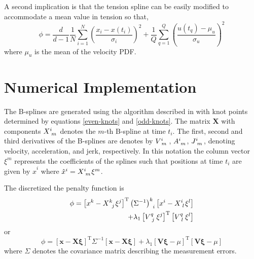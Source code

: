 \documentclass[twocol]{ametsoc}
\begin{document}
A second implication is that the tension spline can be easily modified to accommodate a mean value in tension so that,
\begin{equation}
\phi =  \frac{d}{d-1} \frac{1}{N} \sum^N _{i=1}\left( \frac{x_i - x(t_i)}{\sigma_i} \right)^2 + \frac{1}{Q} \sum^{Q}_{q=1}  \left(  \frac{u(t_q)-\mu_u}{\sigma_u} \right)^2
\end{equation}
where $\mu_u$ is the mean of the velocity PDF.

%
\section{Numerical Implementation}
%

The B-splines are generated using the algorithm described in \citet{deboor1978-book} with knot points determined by equations \ref{even-knots} and \ref{odd-knots}. The matrix $\mathbf{X}$ with components $X\indices{^i_m}$ denotes the $m$-th B-spline at time $t_i$. The first, second and third derivatives of the B-splines are denotes by $V\indices{^i_m}$, $A\indices{^i_m}$, $J\indices{^i_m}$, denoting velocity, acceleration, and jerk, respectively. In this notation the column vector $\xi^m$ represents the coefficients of the splines such that positions at time $t_i$ are given by $\hat{x}^i$ where $\hat{x}^i =  X\indices{^i_m} \xi^m$.

The discretized the penalty function is
\begin{equation}
\begin{split}
\phi = \left[ x^k - X\indices{^k_j} \xi^j \right]^{\textrm{T}} \left(\Sigma^{-1}\right)\indices{^k_i} \left[ x^i - X\indices{^i_l} \xi^l \right] \\
+ \lambda_1 \left[V\indices{^q_j} \xi^j \right]^{\textrm{T}} \left[ V\indices{^q_l} \xi^l \right]
\end{split}
\end{equation}
or
\begin{equation}
\phi = \left[ \mathbf{x} - \mathbf{X} \mathbf{\xi} \right]^{\textrm{T}} \Sigma^{-1} \left[ \mathbf{x} - \mathbf{X} \mathbf{\xi}\right]
+ \lambda_1 \left[\mathbf{V}\mathbf{\xi} - \mu \right]^{\textrm{T}} \left[ \mathbf{V}\mathbf{\xi} - \mu \right]
\end{equation}
where $\Sigma$ denotes the covariance matrix describing the measurement errors.
\end{document}
